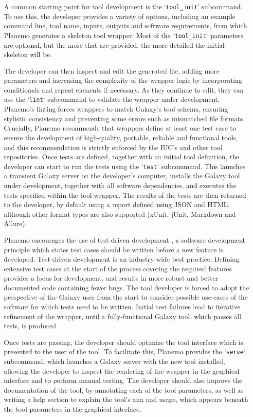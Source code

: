 A common starting point for tool development is the
`\texttt{tool\_init}' subcommand. To use this, the developer provides a
variety of options, including an example command line, tool name,
inputs, outputs and software requirements, from which Planemo generates
a skeleton tool wrapper. Most of the `\texttt{tool\_init}` parameters
are optional, but the more that are provided, the more detailed the
initial skeleton will be.

The developer can then inspect and edit the generated file, adding more
parameters and increasing the complexity of the wrapper logic by
incorporating conditionals and repeat elements if necessary. As they
continue to edit, they can use the `\texttt{lint}` subcommand to
validate the wrapper under development. Planemo's linting forces
wrappers to match Galaxy's tool schema, ensuring stylistic consistency
and preventing some errors such as mismatched file formats. Crucially,
Planemo recommends that wrappers define at least one test case to ensure
the development of high-quality, portable, reliable and functional
tools, and this recommendation is strictly enforced by the IUC's and
other tool repositories. Once tests are defined, together with an
initial tool definition, the developer can start to run the tests using
the `\texttt{test}` subcommand. This launches a transient Galaxy server
on the developer's computer, installs the Galaxy tool under development,
together with all software dependencies, and executes the tests
specified within the tool wrapper. The results of the tests are then
returned to the developer, by default using a report defined using JSON
and HTML, although other format types are also supported (xUnit, jUnit,
Markdown and Allure).

Planemo encourages the use of test-driven development \cite{tdd}, a
software development principle which states test cases should be written
before a new feature is developed. Test-driven development is an
industry-wide best practice. Defining extensive test cases at the start
of the process covering the required features provides a focus for
development, and results in more robust and better documented code
containing fewer bugs. The tool developer is forced to adopt the
perspective of the Galaxy user from the start to consider possible
use-cases of the software for which tests need to be written. Initial
test failures lead to iterative refinement of the wrapper, until a
fully-functional Galaxy tool, which passes all tests, is produced.

Once tests are passing, the developer should optimize the tool interface
which is presented to the user of the tool. To facilitate this, Planemo
provides the `\texttt{serve}` subcommand, which launches a Galaxy server
with the new tool installed, allowing the developer to inspect the
rendering of the wrapper in the graphical interface and to perform
manual testing. The developer should also improve the documentation of
the tool, by annotating each of the tool parameters, as well as writing
a help section to explain the tool's aim and usage, which appears
beneath the tool parameters in the graphical interface.

